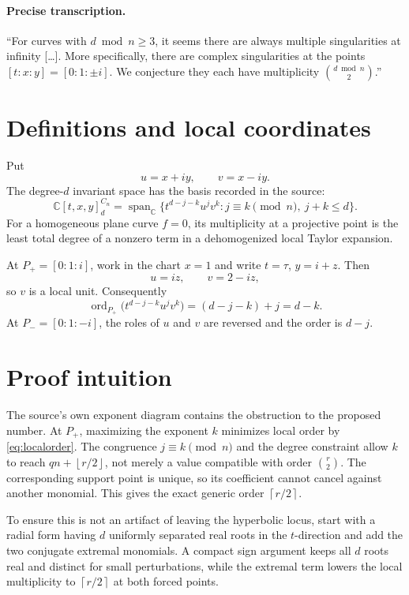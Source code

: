 \documentclass[11pt]{article}
\newcommand{\C}{\mathbb C}
\newcommand{\ord}{\operatorname{ord}}
\newcommand{\ceil}[1]{\left\lceil #1\right\rceil}
\newcommand{\floor}[1]{\left\lfloor #1\right\rfloor}
\begin{document}
\paragraph{Precise transcription.}
``For curves with $d\bmod n\geq3$, it seems there are always multiple
singularities at infinity [\ldots]. More specifically, there are complex
singularities at the points $[t:x:y]=[0:1:\pm i]$. We conjecture they each
have multiplicity $\binom{d\bmod n}{2}$.''

\section{Definitions and local coordinates}

Put
\[
    u=x+iy,\qquad v=x-iy.
\]
The degree-$d$ invariant space has the basis recorded in the source:
\begin{equation}\label{eq:basis}
 \C[t,x,y]^{C_n}_d
 =\operatorname{span}_{\C}
 \bigl\{t^{d-j-k}u^jv^k:
 j\equiv k\pmod n,\ j+k\leq d\bigr\}.
\end{equation}
For a homogeneous plane curve $f=0$, its multiplicity at a projective point
is the least total degree of a nonzero term in a dehomogenized local Taylor
expansion.

At $P_+=[0:1:i]$, work in the chart $x=1$ and write $t=\tau$, $y=i+z$.
Then
\[
   u=iz,\qquad v=2-iz,
\]
so $v$ is a local unit.  Consequently
\begin{equation}\label{eq:localorder}
 \ord_{P_+}\bigl(t^{d-j-k}u^jv^k\bigr)
 =(d-j-k)+j=d-k.
\end{equation}
At $P_-=[0:1:-i]$, the roles of $u$ and $v$ are reversed and the order is
$d-j$.

\section{Proof intuition}

The source's own exponent diagram contains the obstruction to the proposed
number.  At $P_+$, maximizing the exponent $k$ minimizes local order by
\eqref{eq:localorder}.  The congruence $j\equiv k\pmod n$ and the degree
constraint allow $k$ to reach
$qn+\floor{r/2}$, not merely a value compatible with order $\binom r2$.
The corresponding support point is unique, so its coefficient cannot cancel
against another monomial.  This gives the exact generic order $\ceil{r/2}$.

To ensure this is not an artifact of leaving the hyperbolic locus, start with
a radial form having $d$ uniformly separated real roots in the $t$-direction
and add the two conjugate extremal monomials.  A compact sign argument keeps
all $d$ roots real and distinct for small perturbations, while the extremal
term lowers the local multiplicity to $\ceil{r/2}$ at both forced points.
\end{document}
